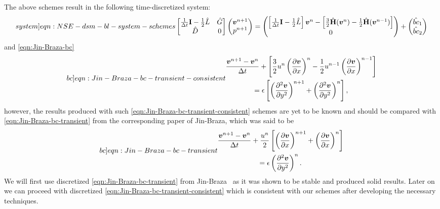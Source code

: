 \documentclass{article}
\numberwithin{equation}{section}
\begin{document}
The above schemes result in the following time-discretized system:
\begin{equation}\label[system]{eqn:NSE-dsm-bl-system-schemes}
	\begin{bmatrix}
		\frac{1}{\Delta t}\mathbf{I}-\frac{1}{2}\hat{L} & \hat{G} \\
		\hat{D} & 0
	\end{bmatrix}
	\begin{pmatrix}
		\boldsymbol{v}^{n+1} \\ 
		p^{n+1}
	\end{pmatrix}
	=
	\begin{pmatrix}
		\left[\frac{1}{\Delta t}\mathbf{I}-\frac{1}{2}\hat{L}\right] \boldsymbol{v}^n - \left[\frac{3}{2}\hat{\mathbf{H}}(\boldsymbol{v}^n) - \frac{1}{2}\hat{\mathbf{H}}(\boldsymbol{v}^{n-1})\right]\\
		0
	\end{pmatrix}
	+
	\begin{pmatrix}
		\hat{bc}_1\\
		\hat{bc}_2
	\end{pmatrix}
\end{equation}
and \cref{eqn:Jin-Braza-bc} 
\begin{equation}\label[bc]{eqn:Jin-Braza-bc-transient-consistent}
\begin{gathered}
\frac{\boldsymbol{v}^{n+1}-\boldsymbol{v}^n}{\Delta t}+\left[\frac{3}{2}{u^n}\left(\frac{\partial \boldsymbol{v}}{\partial x}\right)^{n}-\frac{1}{2}{u^{n-1}}\left(\frac{\partial \boldsymbol{v}}{\partial x}\right)^{n-1}\right] \\
=\epsilon\left[\left(\frac{\partial^2 \boldsymbol{v}}{\partial y^2}\right)^{n+1}+\left(\frac{\partial^2 \boldsymbol{v}}{\partial y^2}\right)^{n}\right],
\end{gathered}
\end{equation}
however, the results produced with such \cref{eqn:Jin-Braza-bc-transient-consistent} schemes are yet to be known and should be compared with \cref{eqn:Jin-Braza-bc-transient} from the corresponding paper of Jin-Braza\cite{Jin:1993}, which was said to be 
\begin{equation}\label[bc]{eqn:Jin-Braza-bc-transient}
\begin{gathered}
\frac{\boldsymbol{v}^{n+1}-\boldsymbol{v}^n}{\Delta t}+\frac{u^n}{2}\left[\left(\frac{\partial \boldsymbol{v}}{\partial x}\right)^{n+1}+\left(\frac{\partial \boldsymbol{v}}{\partial x}\right)^n\right] \\
=\epsilon\left(\frac{\partial^2 \boldsymbol{v}}{\partial y^2}\right)^n.
\end{gathered}
\end{equation}
We will first use discretized \cref{eqn:Jin-Braza-bc-transient} from Jin-Braza~\cite{Jin:1993} as it was shown to be stable and produced solid results. Later on we can proceed with discretized \cref{eqn:Jin-Braza-bc-transient-consistent} which is consistent with our schemes after developing the necessary techniques.
\end{document}
